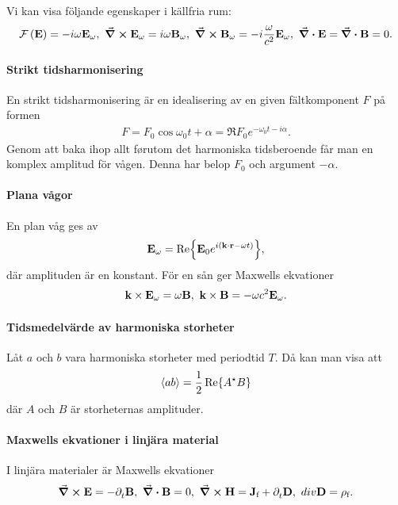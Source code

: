 Vi kan visa följande egenskaper i källfria rum:
\begin{align*}
	\mathcal{F}\left(\vb{E}\right) = -i\omega\vb{E}_{\omega},\ \curl{\vb{E}_{\omega}} = i\omega\vb{B}_{\omega},\ \curl{\vb{B}_{\omega}} = -i\frac{\omega}{c^{2}}\vb{E}_{\omega},\ \div{\vb{E}} = \div{\vb{B}} = 0.
\end{align*}

\paragraph{Strikt tidsharmonisering}
En strikt tidsharmonisering är en idealisering av en given fältkomponent $F$ på formen
\begin{align*}
	F = F_{0}\cos{\omega_{0}t + \alpha} = \Re{F_{0}e^{-\omega_{0}t - i\alpha}}.
\end{align*}
Genom att baka ihop allt førutom det harmoniska tidsberoende får man en komplex amplitud för vågen. Denna har belop $F_{0}$ och argument $-\alpha$.

\paragraph{Plana vågor}
En plan våg ges av
\begin{align*}
	\vb{E}_{\omega} = \Re{\vb{E}_{0}e^{i(\vb{k}\cdot\vb{r} - \omega t)}},
\end{align*}
där amplituden är en konstant. För en sån ger Maxwells ekvationer
\begin{align*}
	\vb{k}\times\vb{E}_{\omega} = \omega\vb{B},\ \vb{k}\times\vb{B} = -\omega c^{2}\vb{E}_{\omega}.
\end{align*}

\paragraph{Tidsmedelvärde av harmoniska storheter}
Låt $a$ och $b$ vara harmoniska storheter med periodtid $T$. Då kan man visa att
\begin{align*}
	\expval{ab} = \frac{1}{2}\Re{A^{\star}B}
\end{align*}
där $A$ och $B$ är storheternas amplituder.

\paragraph{Maxwells ekvationer i linjära material}
I linjära materialer är Maxwells ekvationer
\begin{align*}
	\curl{\vb{E}} = -\partial_{t}^{}\vb{B},\ \div{\vb{B}} = 0,\ \curl{\vb{H}} = \vb{J}_{\text{f}} + \partial_{t}^{}\vb{D},\ div{\vb{D}} = \rho_{\text{f}}.
\end{align*}

